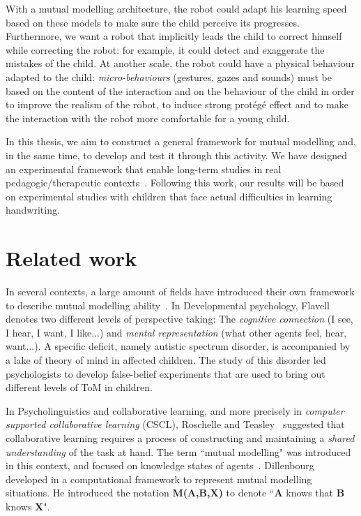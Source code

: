 \documentclass[10pt,a4paper]{article}
\begin{document}
With a mutual modelling architecture, the robot could adapt his learning speed based on these models to make sure the child perceive its progresses. Furthermore, we want a robot that implicitly leads the child to correct himself while correcting the robot: for example, it could detect and exaggerate the mistakes of the child. At another scale, the robot could have a physical behaviour adapted to the child: \textit{micro-behaviours} (gestures, gazes and sounds) must be based on the content of the interaction and on the behaviour of the child in order to improve the realism of the robot, to induce strong prot\'eg\'e effect and to make the interaction with the robot more comfortable for a young child. 

In this thesis, we aim to construct a general framework for mutual modelling and, in the same time, to develop and test it through this activity. We have designed an experimental framework that enable long-term studies in real pedagogic/therapeutic contexts~\cite{jacq2016building}. Following this work, our results will be based on experimental studies with children that face actual difficulties in learning handwriting.

\section{Related work}\label{rw}


In several contexts, a large amount of fields have introduced their own framework to describe mutual modelling ability~\cite{lemaignan2015mutual}. 
In Developmental psychology, Flavell~\cite{flavell1990developmental} denotes two different levels of perspective taking: The \textit{cognitive connection} (I see, I hear, I want, I like...) and \textit{mental representation} (what other agents feel, hear, want...). A specific deficit, namely autistic spectrum disorder, is accompanied by a lake of theory of mind in affected children. The study of this disorder led psychologists to develop false-belief experiments\cite{baron1985does}\cite{frith1994autism} that are used to bring out different levels of ToM in children.

In Psycholinguistics and collaborative learning, and more precisely in \textit{computer supported collaborative learning} (CSCL), Roschelle and Teasley~\cite{roschelle1995construction} suggested that collaborative learning requires a process of constructing and maintaining a \textit{shared understanding} of the task at hand. 
The term ``mutual modelling" was introduced in this context, and focused on knowledge states of agents~\cite{dillenbourg1999you}. Dillenbourg developed in \cite{sangin2007partner} a computational framework to represent mutual modelling situations. He introduced the notation \textbf{M(A,B,X)} to denote ``\textbf{A} knows that \textbf{B} knows \textbf{X}".
\end{document}
